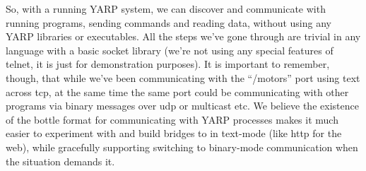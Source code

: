 So, with a running YARP system, we can discover
and communicate with running programs, sending commands and reading
data, without using any YARP libraries or executables.  All the steps
we've gone through are trivial in any language with a basic socket
library (we're not using any special features of telnet, it is just
for demonstration purposes).  It is important to remember, though,
that while we've been communicating with the ``/motors'' port using
text across tcp, at the same time the same port could be communicating
with other programs via binary messages over udp or multicast etc.
%
We believe the existence of the bottle format for communicating
with YARP processes makes it much easier to experiment with and build
bridges to in text-mode (like http for the web), while gracefully
supporting switching to binary-mode communication when the 
situation demands it.



